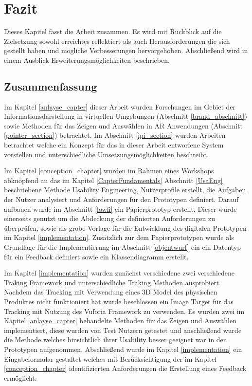 \chapter{Fazit}

Dieses Kapitel fasst die Arbeit zusammen. Es wird mit Rückblick auf die Zielsetzung sowohl erreichtes reflektiert als auch Herausforderungen die sich gestellt haben und mögliche Verbesserungen hervorgehoben. 
Abschließend wird in einem Ausblick Erweiterungsmöglichkeiten beschrieben. 

\section{Zusammenfassung}

Im Kapitel \ref{anlayse_capter} dieser Arbeit wurden Forschungen im Gebiet der Informationsdarstellung in virtuellen Umgebungen (Abschnitt \ref{brand_abschnitt}) sowie Methoden für das 
Zeigen und Auswählen in AR Anwendungen (Abschnitt \ref{pointer_section}) betrachtet. Im Abschnitt \ref{ipi_section} wurden Arbeiten betrachtet welche ein Konzept für das in dieser Arbeit entworfene System vorstellen
und unterschiedliche Umsetzungsmöglichkeiten beschreibt. 

Im Kapitel \ref{conception_chapter} wurden im Rahmen eines Workshops abknöpfend an das im Kapitel \ref{CapterFundamentals} Abschnitt \ref{UsaEng} beschriebene Methode Usability Engineering, Nutzerprofile erstellt, die Aufgaben 
der Nutzer analysiert und Anforderungen für den Prototypen definiert. Darauf aufbauen wurde im Abschnitt \ref{lowfi} ein Papierprototyp erstellt. Dieser wurde einerseits genutzt um die Abdeckung der definierten Anforderungen 
zu überprüfen, sowie als grobe Vorlage für die Entwicklung des digitalen Prototypen im Kapitel \ref{implementation}. Zusätzlich zur dem Papierprototypen wurde als Grundlage für die Implementierung im Abschnitt \ref{objentwurf} ein 
ein Datentyp für ein Feedback definiert sowie ein Klassendiagramm erstellt. 

Im Kapitel \ref{implementation} wurden zunächst verschiedene zwei verschiedene Traking Framework und unterschiedliche Traking Methoden ausprobiert. 
Nachdem das Tracking mit Verwendung eines 3D Model des physischen Produktes nicht funktioniert hat wurde beschlossen ein Image Target für das Tracking mit Nutzung
des Vuforia Framework zu verwenden. 
Es wurden zwei im Kapitel \ref{anlayse_capter} behandelte Methoden für das Zeigen und Auswählen implementiert, diese wurden von Test Nutzern getestet und anschließend 
wurde die Methode welches hinsichtlich ihrer Usability besser geeignet war in den Prototypen aufgenommen. Abschließend wurde im Kapitel \ref{implementation} ein Eingabeformular
gestaltet welches mit Berücksichtigung der im Kapitel \ref{conception_chapter} identifizierten Anforderungen die Erstellung eines Feedback ermöglicht.  

